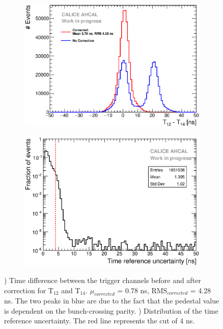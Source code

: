 \documentclass{JINST}
\begin{document}
\begin{figure}[htbp!]
  \begin{subfigure}[t]{0.49\textwidth}
    \centering
    \includegraphics[width=1\linewidth]{fig/T0_Resolution_5.eps}
    \caption{} \label{fig:T0Corr}
  \end{subfigure}
  \hfill
  \begin{subfigure}[t]{0.49\textwidth}
    \centering
    \includegraphics[width=1\linewidth]{fig/T0ReferenceError.eps}
    \caption{} \label{fig:TRefErr}
  \end{subfigure}
  \caption{) Time difference between the trigger channels before and after correction for T$_{12}$ and T$_{14}$. $\mu_{corrected}$ = 0.78 ns, RMS$_{corrected}$ = 4.28 ns. The two peaks in blue are due to the fact that the pedestal value is dependent on the bunch-crossing parity. ) Distribution of the time reference uncertainty. The red line represents the cut of 4 ns.}
\end{figure}
\end{document}
